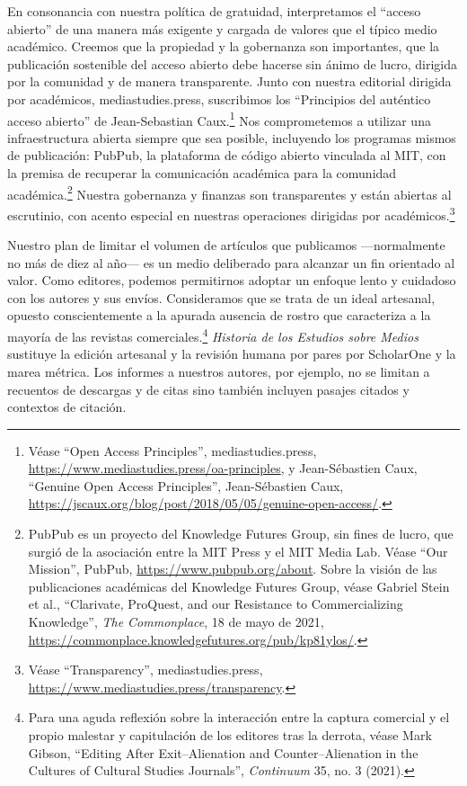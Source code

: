 \documentclass{tufte-handout}
\begin{document}
En consonancia con nuestra política de gratuidad, interpretamos el
``acceso abierto'' de una manera más exigente y cargada de valores que
el típico medio académico. Creemos que la propiedad y la gobernanza son
importantes, que la publicación sostenible del acceso abierto debe
hacerse sin ánimo de lucro, dirigida por la comunidad y de manera
transparente. Junto con nuestra editorial dirigida por académicos,
mediastudies.press, suscribimos los ``Principios del auténtico acceso
abierto'' de Jean-Sebastian Caux.\footnote{Véase ``Open Access
  Principles'', mediastudies.press,
  \url{https://www.mediastudies.press/oa-principles}, y Jean-Sébastien
  Caux, ``Genuine Open Access Principles'', Jean-Sébastien Caux,
  \url{https://jscaux.org/blog/post/2018/05/05/genuine-open-access/}.}
Nos comprometemos a utilizar una infraestructura abierta siempre que sea
posible, incluyendo los programas mismos de publicación: PubPub, la
plataforma de código abierto vinculada al MIT, con la premisa de
recuperar la comunicación académica para la comunidad
académica.\footnote{PubPub es un proyecto del Knowledge Futures Group,
  sin fines de lucro, que surgió de la asociación entre la MIT Press y
  el MIT Media Lab. Véase ``Our Mission'', PubPub,
  \url{https://www.pubpub.org/about}. Sobre la visión de las
  publicaciones académicas del Knowledge Futures Group, véase Gabriel
  Stein et al., ``Clarivate, ProQuest, and our Resistance to
  Commercializing Knowledge'', \emph{The Commonplace}, 18 de mayo de
  2021, \url{https://commonplace.knowledgefutures.org/pub/kp81ylos/}.}
Nuestra gobernanza y finanzas son transparentes y están abiertas al
escrutinio, con acento especial en nuestras operaciones dirigidas por
académicos.\footnote{Véase ``Transparency'', mediastudies.press,
  \url{https://www.mediastudies.press/transparency}.}

Nuestro plan de limitar el volumen de artículos que publicamos
---normalmente no más de diez al año--- es un medio deliberado para
alcanzar un fin orientado al valor. Como editores, podemos permitirnos
adoptar un enfoque lento y cuidadoso con los autores y sus envíos.
Consideramos que se trata de un ideal artesanal, opuesto conscientemente
a la apurada ausencia de rostro que caracteriza a la mayoría de las
revistas comerciales.\footnote{Para una aguda reflexión sobre la
  interacción entre la captura comercial y el propio malestar y
  capitulación de los editores tras la derrota, véase Mark Gibson,
  ``Editing After Exit--Alienation and Counter--Alienation in the
  Cultures of Cultural Studies Journals'', \emph{Continuum} 35, no. 3
  (2021).} \emph{Historia de los Estudios sobre Medios} sustituye la
edición artesanal y la revisión humana por pares por ScholarOne y la
marea métrica. Los informes a nuestros autores, por ejemplo, no se
limitan a recuentos de descargas y de citas sino también incluyen
pasajes citados y contextos de citación.
\end{document}
